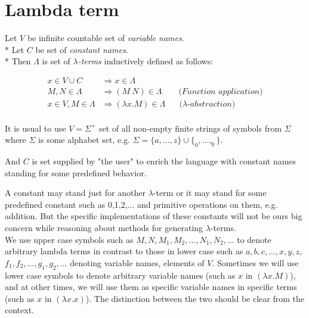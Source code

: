 \documentclass[12pt,a4paper]{report}
\newcommand{\lterm}{$\lambda$-term\xspace}
\newcommand{\lterms}{$\lambda$-terms\xspace}
\newcommand{\setDots}[2]{ 
	\lbrace #1 , \dots , #2 \rbrace
}
\begin{document}
\newpage		
\section{Lambda term}
\label{deflam}

\newcommand{\then}{\Rightarrow\xspace}

Let $V$ be infinite countable set of {\it 
variable names}.  \\* 
Let $C$ be set of {\it constant names}.	 \\*		
Then $\Lambda$ is set of {\it \lterms} inductively defined as follows:

\newcommand{\lamb}[2]{( \lambda #1 . #2 )}
\newcommand{\lam}[2]{\lambda #1 . #2}

	
\begin{align*}
x   \in V \cup C          &\then x           \in \Lambda \\
M,N \in \Lambda           &\then (M~N)       \in \Lambda 
\textit{~~~~~~(Function application)} \\
x   \in V , M \in \Lambda &\then \lamb{x}{M} \in \Lambda
\textit{~~~~~($\lambda$-abstraction)} 
\end{align*}
\\
It is usual to use $V = \Sigma^+$ set of all non-empty finite strings of symbols 
from $\Sigma$ where $\Sigma$ is some alphabet set, e.g.  
$
\Sigma =
\setDots{a}{z} \cup 
\setDots{_0}{_9} $.

And $C$ is set supplied by "the user" to enrich 
the language with constant names standing
for some predefined behavior.

A constant may stand just for another \lterm
or it may stand for some predefined constant 
such as 0,1,2,... and primitive operations on
them, e.g. addition. 
But the specific implementations 
of these constants will not be ours big concern 
while reasoning about methods for generating 
\lterms .\\

We use upper case symbols such as 
$M,N,M_1,M_2,...,N_1,N_2,...$
to denote arbitrary lambda terms in contrast to
those in lower case such as
$a,b,c,...,x,y,z,$
$f_1,f_2,...,g_1,g_2,...$
denoting variable names, elements of $V$.
Sometimes we will use lower case symbols
to denote arbitrary variable names (such as
$x$ in $\lamb{x}{M}$),
and at other times, we will use them
as specific variable names in specific terms 
(such as $x$ in $\lamb{x}{x}$).
The distinction between the two should be
clear from the context.\\
	
\end{document}
